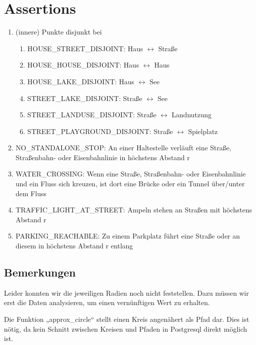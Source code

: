 \documentclass[a4paper]{article}
\begin{document}
\section{Assertions}
\begin{enumerate}
    \item (innere) Punkte disjunkt bei
    \begin{enumerate}
        \item HOUSE\_STREET\_DISJOINT: Haus $\longleftrightarrow$ Straße
        \item HOUSE\_HOUSE\_DISJOINT: Haus $\longleftrightarrow$ Haus
        \item HOUSE\_LAKE\_DISJOINT: Haus $\longleftrightarrow$ See
        \item STREET\_LAKE\_DISJOINT: Straße $\longleftrightarrow$ See
        \item STREET\_LANDUSE\_DISJOINT: Straße $\longleftrightarrow$ Landnutzung
        \item STREET\_PLAYGROUND\_DISJOINT: Straße $\longleftrightarrow$ Spielplatz
    \end{enumerate}
    
    \item NO\_STANDALONE\_STOP: An einer Haltestelle verläuft eine Straße,
        Straßenbahn- oder Eisenbahnlinie in höchstens Abstand r
    \item WATER\_CROSSING: Wenn eine Straße, Straßenbahn- oder Eisenbahnlinie und ein Fluss sich kreuzen,
        ist dort eine Brücke oder ein Tunnel über/unter dem Fluss
    \item TRAFFIC\_LIGHT\_AT\_STREET: Ampeln stehen an Straßen mit höchstens Abstand r
    \item PARKING\_REACHABLE: Zu einem Parkplatz führt eine Straße oder an diesem in höchstens Abstand r entlang
\end{enumerate}



\subsection{Bemerkungen}
Leider konnten wir die jeweiligen Radien noch nicht feststellen. Dazu müssen wir erst die Daten
analysieren, um einen vernünftigen Wert zu erhalten.

Die Funktion „approx\_circle“ stellt einen Kreis angenähert als Pfad dar. Dies ist nötig, da kein Schnitt
zwischen Kreisen und Pfaden in Postgresql direkt möglich ist.
\end{document}
